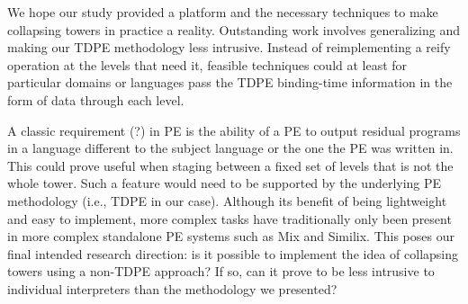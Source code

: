 \documentclass[a4paper,12pt,twoside,openright]{report}
\theoremstyle{definition}
\begin{document}
We hope our study provided a platform and the necessary techniques to make collapsing towers in practice a reality. Outstanding work involves generalizing and making our TDPE methodology less intrusive. Instead of reimplementing a reify operation at the levels that need it, feasible techniques could at least for particular domains or languages pass the TDPE binding-time information in the form of data through each level.

A classic requirement (?) in PE is the ability of a PE to output residual programs in a language different to the subject language or the one the PE was written in. This could prove useful when staging between a fixed set of levels that is not the whole tower. Such a feature would need to be supported by the underlying PE methodology (i.e., TDPE in our case). Although its benefit of being lightweight and easy to implement, more complex tasks have traditionally only been present in more complex standalone PE systems such as Mix and Similix. This poses our final intended research direction: is it possible to implement the idea of collapsing towers using a non-TDPE approach? If so, can it prove to be less intrusive to individual interpreters than the methodology we presented?
\end{document}
